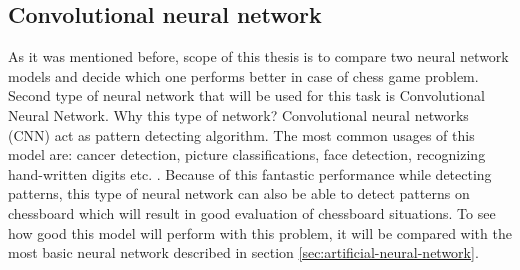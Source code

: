     \subsection{Convolutional neural network}
    As it was mentioned before, scope of this thesis is to compare two neural network models and decide which one performs better in case of chess game problem. Second type of neural network that will be used for this task is Convolutional Neural Network. Why this type of network? Convolutional neural networks (CNN) act as pattern detecting algorithm. The most common usages of this model are: cancer detection, picture classifications, face detection, recognizing hand-written digits etc. \cite{bib:internet-real-world-applications-of-cnn}. Because of this fantastic performance while detecting patterns, this type of neural network can also be able to detect patterns on chessboard which will result in good evaluation of chessboard situations. To see how good this model will perform with this problem, it will be compared with the most basic neural network described in section \ref{sec:artificial-neural-network}.

